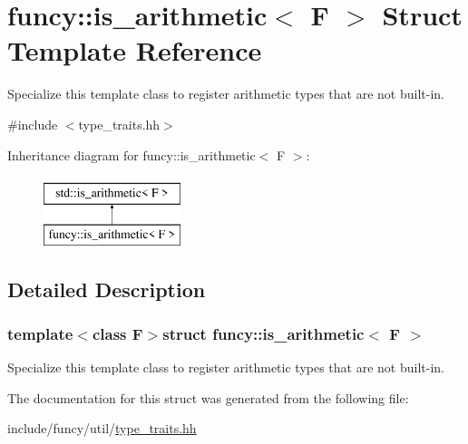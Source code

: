 \hypertarget{structfuncy_1_1is__arithmetic}{\section{funcy\-:\-:is\-\_\-arithmetic$<$ F $>$ Struct Template Reference}
\label{structfuncy_1_1is__arithmetic}
}


Specialize this template class to register arithmetic types that are not built-\/in.  




{\ttfamily \#include $<$type\-\_\-traits.\-hh$>$}

Inheritance diagram for funcy\-:\-:is\-\_\-arithmetic$<$ F $>$\-:\begin{figure}[H]
\begin{center}
\leavevmode
\includegraphics[height=2.000000cm]{structfuncy_1_1is__arithmetic}
\end{center}
\end{figure}


\subsection{Detailed Description}
\subsubsection*{template$<$class F$>$struct funcy\-::is\-\_\-arithmetic$<$ F $>$}

Specialize this template class to register arithmetic types that are not built-\/in. 

The documentation for this struct was generated from the following file\-:\begin{DoxyCompactItemize}
\item 
include/funcy/util/\hyperlink{type__traits_8hh}{type\-\_\-traits.\-hh}\end{DoxyCompactItemize}
